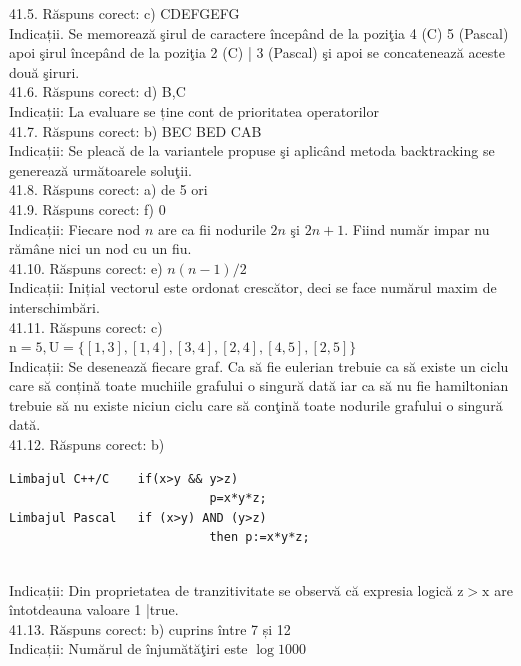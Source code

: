 41.5. Răspuns corect: c) CDEFGEFG\\
Indicații. Se memorează şirul de caractere începând de la poziţia 4 (C) 5 (Pascal) apoi şirul începând de la poziţia 2 (C) | 3 (Pascal) şi apoi se concatenează aceste două şiruri.\\

41.6. Răspuns corect: d) B,C\\
Indicații: La evaluare se ține cont de prioritatea operatorilor\\

41.7. Răspuns corect: b) BEC BED CAB\\
Indicații: Se pleacă de la variantele propuse şi aplicând metoda backtracking se generează următoarele soluţii.\\

41.8. Răspuns corect: a) de 5 ori\\

41.9. Răspuns corect: f) 0\\
Indicații: Fiecare nod $n$ are ca fii nodurile $2 n$ şi $2 n+1$. Fiind număr impar nu rămâne nici un nod cu un fiu.\\

41.10. Răspuns corect: e) $n(n-1) / 2$\\
Indicații: Inițial vectorul este ordonat crescător, deci se face numărul maxim de interschimbări.\\

41.11. Răspuns corect: c) $\mathrm{n}=5, \mathrm{U}=\{[1,3],[1,4],[3,4],[2,4],[4,5],[2,5]\}$\\
Indicații: Se desenează fiecare graf. Ca să fie eulerian trebuie ca să existe un ciclu care să conțină toate muchiile grafului o singură dată iar ca să nu fie hamiltonian trebuie să nu existe niciun ciclu care să conţină toate nodurile grafului o singură dată.\\

41.12. Răspuns corect: b) \begin{verbatim}
Limbajul C++/C    if(x>y && y>z) 
                            p=x*y*z; 
Limbajul Pascal   if (x>y) AND (y>z) 
                            then p:=x*y*z;
\end{verbatim}\\
Indicații: Din proprietatea de tranzitivitate se observă că expresia logică $\mathrm{z}>\mathrm{x}$ are întotdeauna valoare 1 |true.\\

41.13. Răspuns corect: b) cuprins între 7 și 12\\
Indicații: Numărul de înjumătăţiri este $\log 1000$\\

